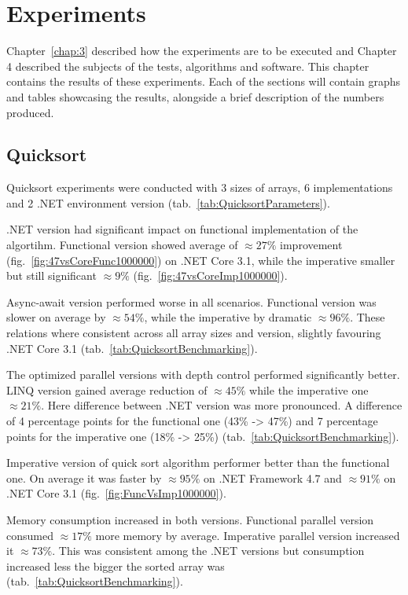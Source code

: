 \chapter{Experiments}
\label{chap:5}
Chapter~\ref{chap:3} described how the experiments are to be executed and Chapter 4 described the subjects of the tests, algorithms and software. This chapter contains the results of these experiments. Each of the sections will contain graphs and tables showcasing the results, alongside a brief description of the numbers produced. 

\section{Quicksort}
\label{sec: QuickSort}
Quicksort experiments were conducted with 3 sizes of arrays, 6 implementations and 2 .NET environment version (tab.~\ref{tab:QuicksortParameters}). 

.NET version had significant impact on functional implementation of the algortihm. Functional version showed average of $\approx 27\%$ improvement (fig.~\ref{fig:47vsCoreFunc1000000}) on .NET Core 3.1, while the imperative smaller but still significant  $\approx 9\%$ (fig.~\ref{fig:47vsCoreImp1000000}).

Async-await version performed worse in all scenarios. Functional version was slower on average by $\approx 54\%$, while the imperative by dramatic $\approx 96\%$. These relations where consistent across all array sizes and version, slightly favouring .NET Core 3.1 (tab.~\ref{tab:QuicksortBenchmarking}).

The optimized parallel versions with depth control performed significantly better. LINQ version gained average reduction  of $\approx 45\%$ while the imperative one 
$\approx 21\%$. Here difference between .NET version was more pronounced. A difference of 4 percentage points for the functional one (43\% -> 47\%) and 7 percentage points for the imperative one (18\% -> 25\%) (tab.~\ref{tab:QuicksortBenchmarking}).

Imperative version of quick sort algorithm performer better than the functional one. On average it was faster by $\approx 95\%$ on .NET Framework 4.7 and $\approx 91\%$ on .NET Core 3.1 (fig.~\ref{fig:FuncVsImp1000000}).

Memory consumption increased in both versions. Functional parallel version consumed $\approx 17\%$ more memory by average. Imperative parallel version increased it $\approx 73\%$. This was consistent among the .NET versions but consumption increased less the bigger the sorted array was (tab.~\ref{tab:QuicksortBenchmarking}).


